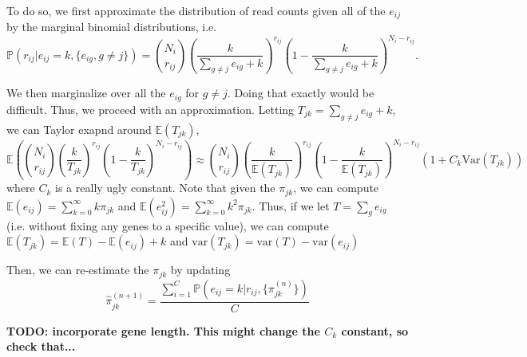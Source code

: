 \documentclass[11pt, oneside]{article}   	%
\begin{document}
To do so, we first approximate the distribution of read counts given all of the $e_{ij}$ by the marginal binomial distributions, i.e.
\[
\mathbb{P}(r_{ij} | e_{ij} = k, \{e_{ig}, g \neq j\}) = \binom{N_i}{r_{ij}} \left(\frac{k}{\sum_{g \neq j} e_{ig} + k}\right)^{r_{ij}}\left(1-\frac{k}{\sum_{g \neq j} e_{ig} + k}\right)^{N_i - r_{ij}}.
\]

We then marginalize over all the $e_{ig}$ for $g \neq j$. Doing that exactly would be difficult. Thus, we proceed with an approximation. Letting $T_{jk} = \sum_{g \neq j }e_{ig} + k$, we can Taylor exapnd around $\mathbb{E}(T_{jk})$, 
\[
\mathbb{E}\left(\binom{N_i}{r_{ij}} \left(\frac{k}{T_{jk}}\right)^{r_{ij}}\left(1-\frac{k}{T_{jk}}\right)^{N_i - r_{ij}}\right) \approx \binom{N_i}{r_{ij}} \left(\frac{k}{\mathbb{E}(T_{jk})} \right)^{r_{ij}}\left(1 - \frac{k}{\mathbb{E}(T_{jk})} \right)^{N_i - r_{ij}}\left(1 + C_k \text{Var}(T_{jk})\right)
\]
where $C_k$ is a really ugly constant. Note that given the $\pi_{jk}$, we can compute $\mathbb{E}(e_{ij}) = \sum_{k=0}^\infty k \pi_{jk}$ and $\mathbb{E}(e_{ij}^2) = \sum_{k=0}^\infty k^2 \pi_{jk}$. Thus, if we let $T = \sum_g e_{ig}$ (i.e. without fixing any genes to a specific value), we can compute $\mathbb{E}(T_{jk}) = \mathbb{E}(T) - \mathbb{E}(e_{ij})+k$ and $\text{var}(T_{jk}) = \text{var}(T) - \text{var}(e_{ij})$

Then, we can re-estimate the $\pi_{jk}$ by updating
\[
\hat{\pi}_{jk}^{(n+1)} = \frac{\sum_{i=1}^C \mathbb{P}(e_{ij} = k | r_{ij}, \{\pi_{jk}^{(n)}\})}{C}
\]

{\bf TODO: incorporate gene length. This might change the $C_k$ constant, so check that...}
\end{document}
